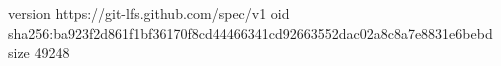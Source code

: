 version https://git-lfs.github.com/spec/v1
oid sha256:ba923f2d861f1bf36170f8cd44466341cd92663552dac02a8c8a7e8831e6bebd
size 49248
